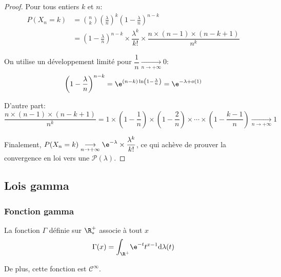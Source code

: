 \begin{proof}
Pour tous entiers $k$ et $n$:
\begin{align*}
P(X_n = k) & = {n \choose k} \left(\frac{\lambda}{n}\right)^k \left(1-\frac{\lambda}{n}\right)^{n-k} \\
 & = \left(1-\frac{\lambda}{n}\right)^{n-k} \times \dfrac{\lambda^k}{k!} \times \dfrac{n \times (n-1) \times (n-k+1)}{n^k}
\end{align*}

On utilise un développement limité pour $\dfrac{1}{n} \underset{n \to +\infty}{\longrightarrow} 0$:
\[\left(1-\frac{\lambda}{n}\right)^{n-k}  = \e^{(n-k)\ln\left(1-\frac{\lambda}{n}\right)}=\e^{-\lambda + o(1)}\]

D'autre part:
\[
\dfrac{n \times (n-1) \times (n-k+1)}{n^k} = 1 \times \left(1-\dfrac{1}{n}\right) \times \left(1-\dfrac{2}{n}\right) \times \cdots \times \left(1-\dfrac{k-1}{n}\right) \underset{n \to +\infty}{\longrightarrow} 1
\]

Finalement, $P(X_n=k) \underset{n \to +\infty}{\longrightarrow} \e^{-\lambda} \times \dfrac{\lambda^k}{k!}$, ce qui achève de prouver la convergence en loi vers une $\mathcal{P}(\lambda)$.
\end{proof}


\subsection{Lois gamma}

\subsubsection{Fonction gamma}

\begin{de}
La fonction $\Gamma$ définie sur $\R^{+}_{*}$ associe à tout $x$
\[
\Gamma(x) = \displaystyle{\int_{\R^+}} \e^{-t} t^{x-1} \mathrm d \lambda(t)
\]

De plus, cette fonction est $\mathcal{C}^{\infty}$.
\end{de}


